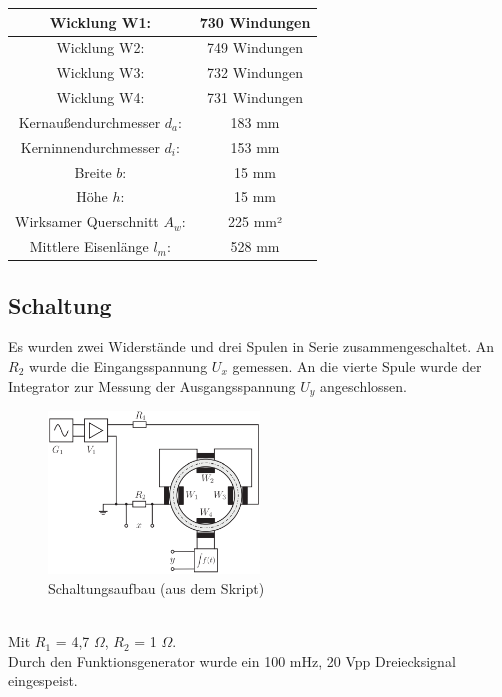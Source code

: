 \documentclass[a4paper,twoside,12pt,DIV=13,BCOR=5mm,numbers=noenddot,cleardoublepage=empty]{scrbook}
\begin{document}
    \begin{center}
    \begin{tabular}{|c|c|} \hline
    Wicklung W1: & 730 Windungen \\ \hline
    Wicklung W2: & 749 Windungen \\ \hline
    Wicklung W3: & 732 Windungen \\ \hline
    Wicklung W4: & 731 Windungen \\ \hline
    Kernaußendurchmesser $d_a$: & 183 mm \\ \hline
    Kerninnendurchmesser $d_i$: & 153 mm \\ \hline
    Breite $b$: & 15 mm \\ \hline
    Höhe $h$: & 15 mm \\ \hline
    Wirksamer Querschnitt $A_w$: & 225 mm² \\ \hline
    Mittlere Eisenlänge $l_m$: & 528 mm \\ \hline
    \end{tabular}
    \end{center}
    
    \subsection{Schaltung}

    Es wurden zwei Widerstände und drei Spulen in Serie zusammengeschaltet. An \textit{$R_2$} wurde die Eingangsspannung $U_x$ gemessen. An die vierte Spule wurde der Integrator zur Messung der Ausgangsspannung $U_y$ angeschlossen.
    \begin{figure}[h] 
    \centering
    \includegraphics[width=0.5\textwidth]{pictures/HystereseSchaltung.png} %
    \caption{Schaltungsaufbau (aus dem Skript)}
    \end{figure}
    \\
    Mit $R_1$ = 4,7 $\Omega$, $R_2$ = 1 $\Omega$. \\
    Durch den Funktionsgenerator wurde ein 100 mHz, 20 Vpp Dreiecksignal eingespeist.
\end{document}
